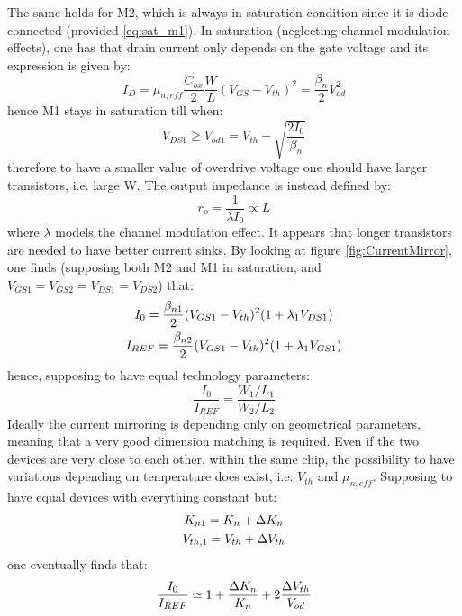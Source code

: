 The same holds for M2, which is always in saturation condition since it is diode connected (provided \ref{eq:sat_m1}). In saturation (neglecting channel modulation effects), one has that drain current only depends on the gate voltage and its expression is given by:
\begin{equation}
\label{eq:Id_quadLaw}
I_D = \mu_{n,eff} \frac{C_{ox}}{2} \frac{W}{L} (V_{GS}-V_{th})^2 = \frac{\beta_{n}}{2}V_{od}^2
\end{equation}
hence M1 stays in saturation till when:
\begin{equation}
V_{DS1}\geq V_{od1}= V_{th}-\sqrt{\frac{2I_0}{\beta_{n}}}
\end{equation}
therefore to have a smaller value of overdrive voltage one should have larger transistors, i.e. large W.
The output impedance is instead defined by:
\begin{equation}
 r_o = \frac{1}{\lambda I_0} \propto L
\end{equation}
where $\lambda$ models the channel modulation effect. It appears that longer transistors are needed to have better current sinks.
By looking at figure \ref{fig:CurrentMirror}, one finds (supposing both M2 and M1 in saturation, and $V_{GS1}=V_{GS2}=V_{DS1}=V_{DS2}$) that:
\begin{gather}
I_0 = \frac{\beta_{n1}}{2}(V_{GS1}-V_{th})^2(1+\lambda_1V_{DS1}) \notag \\
I_{REF} = \frac{\beta_{n2}}{2}(V_{GS1}-V_{th})^2(1+\lambda_1V_{GS1}) \notag
\end{gather}
hence, supposing to have equal technology parameters:
\begin{equation}
\frac{I_0}{I_{REF}} = \frac{W_1/L_1}{W_2/L_2} 
\end{equation}
Ideally the current mirroring is depending only on geometrical parameters, meaning that a very good dimension matching is required. Even if the two devices are very close to each other, within the same chip, the possibility to have variations depending on temperature does exist, i.e. $V_{th}$ and $\mu_{n,eff}$. Supposing to have equal devices with everything constant but:
\begin{gather}
K_{n1}=K_n+\Delta K_n \notag \\
V_{th,1} = V_{th}+\Delta V_{th} \notag
\end{gather}
one eventually finds that:
\begin{equation}
\frac{I_0}{I_{REF}} \simeq 1 + \frac{\Delta K_n}{K_n}+2\frac{\Delta V_{th}}{V_{od}} \notag
\end{equation}
